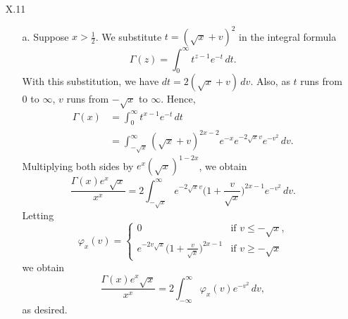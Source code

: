 \documentclass[11pt]{book}
\theoremstyle{definition}
\begin{document}
\begin{enumerate}
  \item[X.11]
    \begin{enumerate}
        \item[a.]  Suppose $x>\tfrac 1 2$.   We substitute $t= (\sqrt x + v)^2$ in the integral formula 
          \[ \Gamma(z) = \int_0^\infty t^{z-1} e^{-t} \, dt. \]  With this substitution, we have $dt = 2 ( \sqrt x + v) \, dv$.  Also, as $t$ runs from $0$ to $\infty$, $v$ runs from $-\sqrt x$ to $\infty$.  Hence,
          \begin{align*}
            \Gamma(x) &= \int_0^\infty t^{x-1} e^{-t} \, dt \\
            &= \int_{-\sqrt x}^\infty (\sqrt x + v)^{2x-2} e^{-x} e^{-2\sqrt x v} e^{-v^2} \, dv. 
          \end{align*}
          Multiplying both sides by $e^x (\sqrt x)^{1-2x}$, we obtain
          \[ \frac{\Gamma(x) e^x \sqrt x}{x^x} = 2 \int_{-\sqrt x}^\infty e^{-2\sqrt x v} \Big( 1 + \frac{v}{\sqrt x} \Big)^{2x-1} e^{-v^2} \, dv. \]  Letting 
          \[ \varphi_x(v) = \begin{cases} 0 & \text{if $v\leq - \sqrt x$,} \\
              e^{-2v\sqrt x} \Big(1  + \frac{v}{\sqrt x} \Big)^{2x-1} & \text{if $v\geq -\sqrt x$} \end{cases} \] we obtain
              \[ \frac{\Gamma(x) e^x \sqrt x}{x^x} = 2 \int_{-\infty}^\infty \varphi_x(v) e^{-v^2} \, dv, \]  as desired. 


\end{enumerate}
\end{enumerate}
\end{document}
